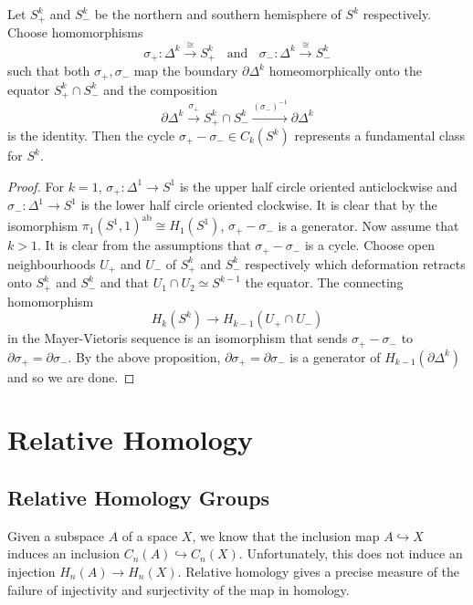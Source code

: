 \documentclass[a4paper]{article}
\begin{document}
\begin{crl}{}{} Let $S_+^k$ and $S_-^k$ be the northern and southern hemisphere of $S^k$ respectively. Choose homomorphisms $$\sigma_+:\Delta^k\overset{\cong}{\longrightarrow} S_+^k\;\;\text{ and }\;\;\sigma_-:\Delta^k\overset{\cong}{\longrightarrow} S_-^k$$ such that both $\sigma_+,\sigma_-$ map the boundary $\partial\Delta^k$ homeomorphically onto the equator $S_+^k\cap S_-^k$ and the composition $$\partial\Delta^k\overset{\sigma_+}{\longrightarrow}S_+^k\cap S_-^k\overset{(\sigma_-)^{-1}}{\longrightarrow}\partial\Delta^k$$ is the identity. Then the cycle $\sigma_+-\sigma_-\in C_k(S^k)$ represents a fundamental class for $S^k$. \tcbline
\begin{proof}
For $k=1$, $\sigma_+:\Delta^1\to S^1$ is the upper half circle oriented anticlockwise and $\sigma_-:\Delta^1\to S^1$ is the lower half circle oriented clockwise. It is clear that by the isomorphism $\pi_1(S^1,1)^\text{ab}\cong H_1(S^1)$, $\sigma_+-\sigma_-$ is a generator. Now assume that $k>1$. It is clear from the assumptions that $\sigma_+-\sigma_-$ is a cycle. Choose open neighbourhoods $U_+$ and $U_-$ of $S_+^k$ and $S_-^k$ respectively which deformation retracts onto $S_+^k$ and $S_-^k$ and that $U_1\cap U_2\simeq S^{k-1}$ the equator. The connecting homomorphism $$H_k(S^k)\to H_{k-1}(U_+\cap U_-)$$ in the Mayer-Vietoris sequence is an isomorphism that sends $\sigma_+-\sigma_-$ to $\partial\sigma_+=\partial\sigma_-$. By the above proposition, $\partial\sigma_+=\partial\sigma_-$ is a generator of $H_{k-1}(\partial\Delta^k)$ and so we are done. 
\end{proof}
\end{crl}

\pagebreak
\section{Relative Homology}
\subsection{Relative Homology Groups}
Given a subspace $A$ of a space $X$, we know that the inclusion map $A\hookrightarrow X$ induces an inclusion $C_n(A)\hookrightarrow C_n(X)$. Unfortunately, this does not induce an injection $H_n(A)\to H_n(X)$. Relative homology gives a precise measure of the failure of injectivity and surjectivity of the map in homology. 
\end{document}

